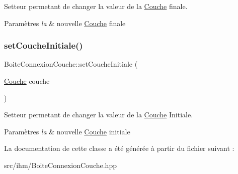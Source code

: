 Setteur permetant de changer la valeur de la \hyperlink{classCouche}{Couche} finale. 


\begin{DoxyParams}{Paramètres}
{\em la} & nouvelle \hyperlink{classCouche}{Couche} finale \\
\hline
\end{DoxyParams}
\mbox{\label{classBoiteConnexionCouche_aca89aac7d4ae0ba89828c6d542790925}} 
\subsubsection{\texorpdfstring{set\+Couche\+Initiale()}{setCoucheInitiale()}}
{\footnotesize\ttfamily Boite\+Connexion\+Couche\+::set\+Couche\+Initiale (\begin{DoxyParamCaption}\item[{\hyperlink{classCouche}{Couche}}]{couche }\end{DoxyParamCaption})}



Setteur permetant de changer la valeur de la \hyperlink{classCouche}{Couche} Initiale. 


\begin{DoxyParams}{Paramètres}
{\em la} & nouvelle \hyperlink{classCouche}{Couche} initiale \\
\hline
\end{DoxyParams}


La documentation de cette classe a été générée à partir du fichier suivant \+:\begin{DoxyCompactItemize}
\item 
src/ihm/Boite\+Connexion\+Couche.\+hpp\end{DoxyCompactItemize}
